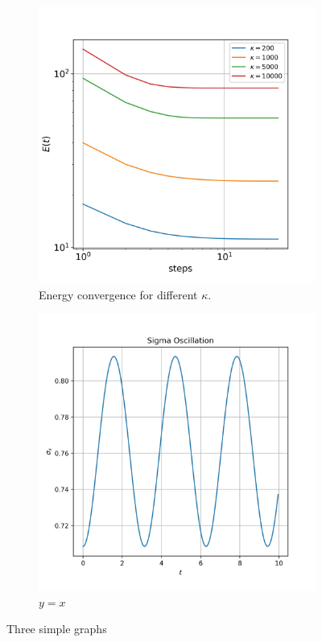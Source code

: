 \documentclass{article}
\begin{document}
\begin{figure}
    \centering
    \begin{subfigure}[b]{0.45\textwidth}
        \centering
        \includegraphics[width=\textwidth]{imgs/gradient_descent/E_convergence.jpeg}
        \caption{Energy convergence for different $\kappa$.}
        \label{fig:energy-convergence}
    \end{subfigure}
    \hfill
    \begin{subfigure}[b]{0.45\textwidth}
        \centering
        \includegraphics[width=\textwidth]{imgs/sigma_oscillation.jpeg}
        \caption{$y=x$}
        \label{fig:y equals x}
    \end{subfigure}
    
    \caption{Three simple graphs}
    \label{fig:gradient-descent-results}
\end{figure}
\end{document}
